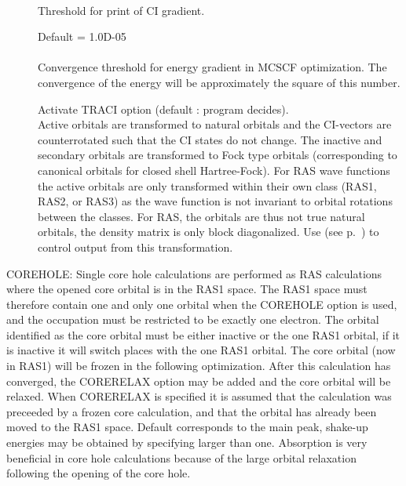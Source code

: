 \begin{description}
\item[]
   \\
  Threshold for print of CI gradient.
 
\item[]
  Default = 1.0D-05\\
   \\
  Convergence threshold for energy gradient in MCSCF optimization.
  The convergence of the energy will be approximately the square of this
  number.
 
\item[]
  Activate TRACI option (default : program decides).\\
  Active orbitals are transformed to natural orbitals and the CI-vectors
  are counterrotated such that the CI states do not change.  The
  inactive and secondary orbitals are transformed to Fock type orbitals
  (corresponding to canonical orbitals for closed shell Hartree-Fock).
  For RAS wave functions the active orbitals are only transformed
  within their own class (RAS1, RAS2, or RAS3) as the wave function is
  not invariant to orbital rotations between the classes.  For RAS, the
  orbitals are thus not true natural orbitals, the density matrix is
  only block diagonalized.  Use  (see
  p.~\pageref{ref-priinp})   to control output from this
  transformation. 

\end{description}
 
 
 
COREHOLE: Single core hole calculations are performed as RAS calculations where
the opened core orbital is in the RAS1 space.  The RAS1 space must therefore
contain one and only one orbital when the COREHOLE option is used, and the
occupation must be restricted to be exactly one electron. The orbital
identified as the core orbital must be either inactive or the one RAS1 orbital,
if it is inactive it will switch places with the one RAS1 orbital.
The core orbital (now in RAS1) will be frozen in the following optimization.
After this calculation has converged, the CORERELAX option may be added
and the core orbital will be relaxed.  When
CORERELAX is specified it is 
assumed that the calculation was preceeded by a frozen
core calculation,
and that the orbital has already been moved to the RAS1 space.
Default corresponds to the main peak, shake-up energies may be obtained
by specifying  larger than one.
Absorption is very beneficial in core hole calculations because of the
large orbital relaxation following the opening of the core hole.
 
